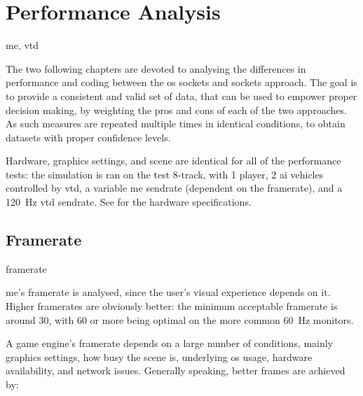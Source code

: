 \chapter{Performance Analysis}\label{ch:performance}

\begin{keywords}
	me, vtd
\end{keywords}

The two following chapters are devoted to analysing the differences in performance and coding between the \gls{os} sockets and  sockets approach. The goal is to provide a consistent and valid set of data, that can be used to empower proper decision making, by weighting the pros and cons of each of the two approaches. As such measures are repeated multiple times in identical conditions, to obtain datasets with proper confidence levels.

Hardware, graphics settings, and scene are identical for all of the performance tests: the simulation is ran on the test 8-track, with \num{1} player, \num{2} \gls{ai} vehicles controlled by \gls{vtd}, a variable \gls{me} \gls{sendrate} (dependent on the \gls{framerate}), and a \SI{120}{\hertz} \gls{vtd} \gls{sendrate}. See  for the hardware specifications.



\section{Framerate}\label{sc:performance:framerate}

\begin{definition}{framerate}
\end{definition}



\gls{me}'s \gls{framerate} is analysed, since the user's visual experience depends on it. Higher \glspl{framerate} are obviously better: the minimum acceptable \gls{framerate} is around \SI{30}{\fps}, with \SI{60}{\fps} or more being optimal on the more common \SI{60}{\hertz} monitors. %

A game engine's \gls{framerate} depends on a large number of conditions, mainly graphics settings, how busy the scene is, underlying \gls{os} usage, hardware availability, and network issues. Generally speaking, better frames are achieved by:


